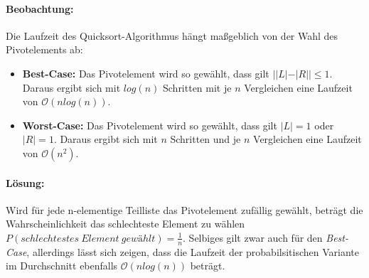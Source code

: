 \paragraph{Beobachtung:}
Die Laufzeit des Quicksort-Algorithmus hängt maßgeblich von der Wahl des Pivotelements ab:
\begin{itemize}
	\item \textbf{Best-Case:} Das Pivotelement wird so gewählt, dass gilt $||L| - |R| | \leq 1$. Daraus ergibt sich mit $log(n)$ Schritten mit je $n$ Vergleichen eine Laufzeit von $\mathcal{O}(nlog(n))$.
	\item \textbf{Worst-Case:} Das Pivotelement wird so gewählt, dass gilt $|L| = 1$ oder $|R| = 1$. Daraus ergibt sich mit $n$ Schritten und je $n$ Vergleichen eine Laufzeit von $\mathcal{O}(n^2)$.
\end{itemize}


\paragraph{Lösung:}
Wird für jede n-elementige Teilliste das Pivotelement zufällig gewählt, beträgt die Wahrscheinlichkeit das schlechteste Element zu wählen $P(schlechtestes\ Element\ gewählt) = \frac{1}{n}$.
Selbiges gilt zwar auch für den \emph{Best-Case}, allerdings lässt sich zeigen, dass die Laufzeit der probabilsitischen Variante im Durchschnitt ebenfalls $\mathcal{O}(nlog(n))$ beträgt. \cite{knuth}








